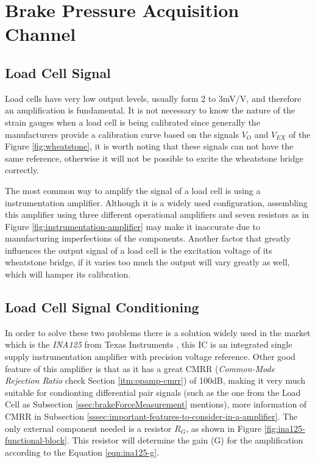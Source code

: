 \section{Brake Pressure Acquisition Channel}\label{sec:brake-pressure-acquisition-channel}

\subsection{Load Cell Signal}\label{ssec:load-cell-signal}

	Load cells have very low output levels, usually form 2 to 3mV/V, and therefore an amplification is fundamental. It is not necessary to know the nature of the strain gauges when a load cell is being calibrated since generally the manufacturers provide a calibration curve based on the signals $V_{O}$ and $V_{EX}$ of the Figure \ref{fig:wheatstone}, it is worth noting that these signals can not have the same reference, otherwise it will not be possible to excite the wheatstone bridge correctly.
	\par
	The most common way to amplify the signal of a load cell is using a instrumentation amplifier. Although it is a widely used configuration, assembling this amplifier using three different operational amplifiers and seven resistors as in Figure \ref{fig:instrumentation-amplifier} may make it inaccurate due to manufacturing imperfections of the components. Another factor that greatly influences the output signal of a load cell is the excitation voltage of its wheatstone bridge, if it varies too much the output will vary greatly as well, which will hamper its calibration.

\subsection{Load Cell Signal Conditioning}\label{ssec:load-cell-signal-conditioning}
		
	In order to solve these two problems there is a solution widely used in the market which is the \textit{INA125} from Texas Instruments \cite{ina125}, this IC is an integrated single supply instrumentation amplifier with precision voltage reference. Other good feature of this amplifier is that as it has a great CMRR (\textit{Common-Mode Rejection Ratio} check Section \ref{itm:opamp-cmrr}) of 100dB, making it very much suitable for condionting differential pair signals (such as the one from the Load Cell as Subsection \ref{ssec:brakeForceMeasurement} mentions), more information of CMRR in Subsection \ref{sssec:important-features-to-consider-in-a-amplifier}. The only external component needed is a resistor $R_{G}$, as shown in Figure \ref{fig:ina125-functional-block}. This resistor will determine the gain (G) for the amplification according to the Equation \ref{eqn:ina125-g}.
	

